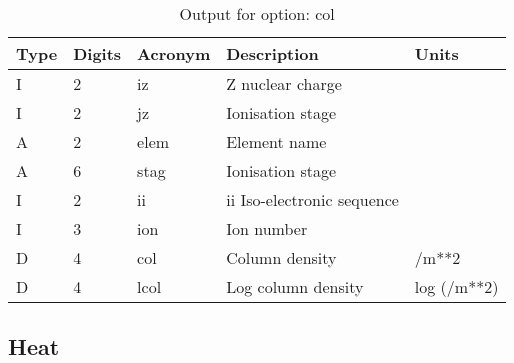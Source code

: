 \begin{table}[!p]
\caption{Output for option: col}
\label{tabout:col}
\begin{tabular}{lllll}
\hline
Type & Digits & Acronym & Description & Units \\ 
\hline
I &  2 & iz   & Z nuclear charge                 &                  \\
I &  2 & jz   & Ionisation stage                 &                  \\
A &  2 & elem & Element name                     &                  \\
A &  6 & stag & Ionisation stage                 &                  \\
I &  2 & ii   & ii Iso-electronic sequence       &                  \\
I &  3 & ion  & Ion number                       &                  \\
D &  4 & col  & Column density                   & /m**2            \\
D &  4 & lcol & Log column density               & log (/m**2)      \\
\hline
\end{tabular}
\end{table}

\subsection{Heat}


